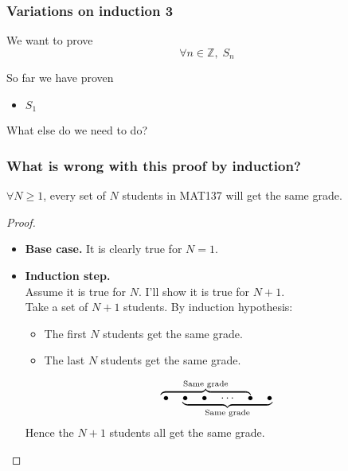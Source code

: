 \documentclass[14pt]{beamer}
\newcommand {\Z}{\mathbb{Z}}
\newcommand{\p}{\pause}
\newcommand{\setsize}[1]{\fontsize{#1}{#1}\selectfont} %
\newcommand{\smallerfont}{\setsize{13}} %
\begin{document}
\begin{frame}
\frametitle{Variations on induction 3}

We want to prove  
	$$\forall n \in \Z, \; S_n $$
	
\vfill

So far we have proven
	\begin{itemize}
		\item  $S_1$
	\end{itemize}	

\vfill	

What else do we need to do?

\end{frame}

\begin{frame}
\frametitle{What is wrong with this proof by induction?}
\smallerfont

\vspace{-1.5mm}
\begin{theorem}
$\forall N \geq 1$, every set of $N$ students in MAT137 will get the same grade.
\end{theorem} \p
\vspace{-1mm}

\begin{proof}
\begin{itemize} 
	\item  {\bf Base case.}  It is clearly true for $N=1$.
	\item  {\bf Induction step.}  \\
		Assume it is true for $N$.  I'll show it is true for $N+1$. \\
		Take a set of $N+1$ students.  By induction hypothesis:
			\begin{itemize}
				\item  The first $N$ students get the same grade.
				\item  The last $N$ students get the same grade.
			\end{itemize}
			$$
				\mathrlap{\overbrace{\phantom{\bullet \quad \bullet \quad \cdots \quad \bullet \quad \bullet }}^{\text{Same grade}}}
				\bullet \quad \underbrace{\bullet \quad \bullet \quad \cdots \quad \bullet \quad \bullet}_{\text{Same grade}}
			$$
		Hence the $N+1$ students all get the same grade.
\end{itemize}
\end{proof}

\end{frame}
\end{document}
